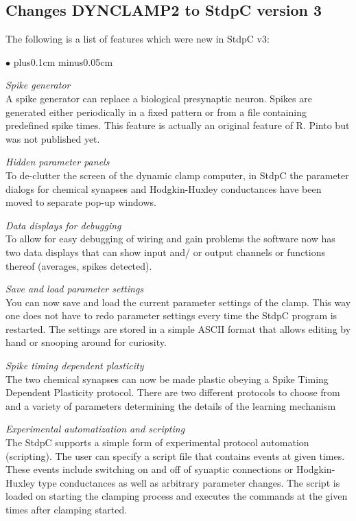 \documentclass{article}
\newenvironment{myitem}{\begin{list}{$\bullet$}{\setlength{\leftmargin}{1.1em}
\itemsep0.1cm plus0.1cm minus0.05cm
\listparindent0cm
\addtolength{\labelsep}{0.5\labelsep}
\setlength{\labelwidth}{0.8em}
\setlength{\leftmargin}{\labelwidth}
\addtolength{\leftmargin}{\labelsep}
}}{\end{list}}
\begin{document}
\subsection{Changes DYNCLAMP2 to StdpC version 3}
The following is a list of features which were new in StdpC v3: 
\begin{myitem}
  \item {\em Spike generator} \\
    A spike generator can replace a biological presynaptic neuron. Spikes are
    generated either periodically in a fixed pattern or from a file
    containing predefined spike times. This feature is actually an original
    feature of R. Pinto but was not published yet.
  \item {\em Hidden parameter panels} \\
    To de-clutter the screen of the dynamic clamp computer, in StdpC the
    parameter dialogs for chemical synapses and Hodgkin-Huxley conductances
    have been moved to separate pop-up windows.
  \item {\em Data displays for debugging} \\
    To allow for easy debugging of wiring and gain problems the software now
    has two data displays that can show input and/ or output channels or
    functions thereof (averages, spikes detected).
  \item {\em Save and load parameter settings} \\
    You can now save and load the current parameter settings of the
    clamp. This way one does not have to redo parameter settings every time
    the StdpC program is restarted. The settings are stored in a simple ASCII
    format that allows editing by hand or snooping around for curiosity. 
  \item {\em Spike timing dependent plasticity} \\
    The two chemical synapses can now be made plastic obeying a Spike Timing
    Dependent Plasticity protocol. There are two different protocols to
    choose from and a variety of parameters determining the details of the
    learning mechanism
  \item {\em Experimental automatization and scripting} \\
    The StdpC supports a simple form of experimental protocol automation
    (scripting). The user can specify a script file that contains events at
    given times. These events include switching on and off of synaptic
    connections or Hodgkin-Huxley type conductances as well as arbitrary
    parameter changes. The script is loaded on starting the clamping process
    and executes the commands at the given times after clamping started.
\end{myitem}
\end{document}
